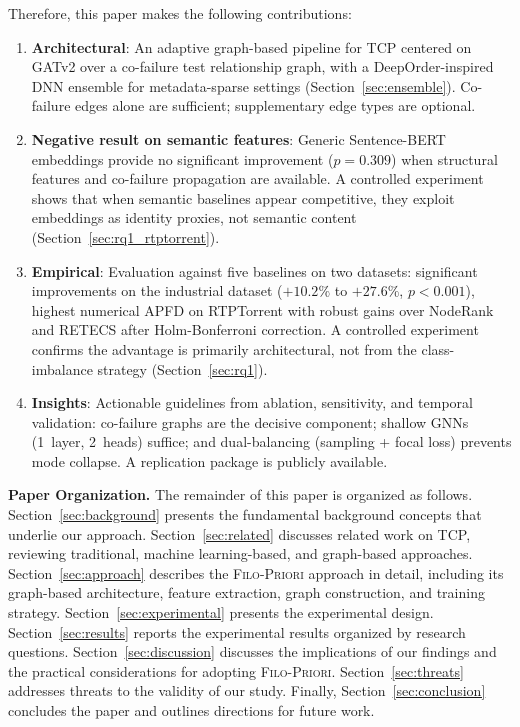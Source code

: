 \documentclass[10pt,journal,compsoc]{IEEEtran}
\newcommand{\filopriori}{\textsc{Filo-Priori}}
\begin{document}
Therefore, this paper makes the following contributions:
\begin{enumerate}
    \item \textbf{Architectural}: An adaptive graph-based pipeline for TCP
    centered on GATv2 over a co-failure test relationship graph, with a
    DeepOrder-inspired~\cite{chen2023deeporder} DNN ensemble for metadata-sparse settings
    (Section~\ref{sec:ensemble}). Co-failure edges alone are sufficient;
    supplementary edge types are optional.
    \item \textbf{Negative result on semantic features}: Generic
    Sentence-BERT embeddings provide no significant improvement
    ($p = 0.309$) when structural features and co-failure propagation are
    available. A controlled experiment shows that when semantic baselines
    appear competitive, they exploit embeddings as identity proxies, not
    semantic content (Section~\ref{sec:rq1_rtptorrent}).
    \item \textbf{Empirical}: Evaluation against five baselines on two
    datasets: significant improvements on the industrial dataset
    ($+10.2\%$ to $+27.6\%$, $p < 0.001$), highest numerical APFD on
    RTPTorrent with robust gains over NodeRank and RETECS after
    Holm-Bonferroni correction. A controlled experiment confirms the
    advantage is primarily architectural, not from the class-imbalance
    strategy (Section~\ref{sec:rq1}).
    \item \textbf{Insights}: Actionable guidelines from ablation,
    sensitivity, and temporal validation: co-failure graphs are the
    decisive component; shallow GNNs (1~layer, 2~heads) suffice; and
    dual-balancing (sampling + focal loss) prevents mode collapse. A
    replication package is publicly available.
\end{enumerate}

\textbf{Paper Organization.} The remainder of this paper is organized as follows.
Section~\ref{sec:background} presents the fundamental background concepts that
underlie our approach.
Section~\ref{sec:related} discusses related work on TCP, reviewing traditional,
machine learning-based, and graph-based approaches.
Section~\ref{sec:approach} describes the \filopriori{} approach in detail,
including its graph-based architecture, feature extraction, graph construction,
and training strategy.
Section~\ref{sec:experimental} presents the experimental design.
Section~\ref{sec:results} reports the experimental results organized by
research questions.
Section~\ref{sec:discussion} discusses the implications of our findings
and the practical considerations for adopting \filopriori{}.
Section~\ref{sec:threats} addresses threats to the validity of our study.
Finally, Section~\ref{sec:conclusion} concludes the paper and outlines
directions for future work.
\end{document}
